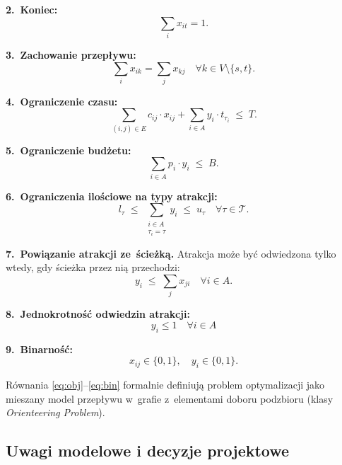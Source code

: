 \textbf{2.\ Koniec:}
\begin{equation}
\sum_{i} x_{i t} = 1 .
\label{eq:end}
\end{equation}

\textbf{3.\ Zachowanie przepływu:}
\begin{equation}
\sum_{i} x_{i k} = \sum_{j} x_{k j}
\quad \forall k \in V \setminus \{s, t\} .
\label{eq:flow}
\end{equation}

\textbf{4.\ Ograniczenie czasu:}
\begin{equation}
\sum_{(i,j) \in E} c_{ij} \cdot x_{ij}
+ \sum_{i \in A} y_i \cdot t_{\tau_i}
\;\le\; T .
\label{eq:time}
\end{equation}

\textbf{5.\ Ograniczenie budżetu:}
\begin{equation}
\sum_{i \in A} p_i \cdot y_i \;\le\; B .
\label{eq:budget}
\end{equation}

\textbf{6.\ Ograniczenia ilościowe na typy atrakcji:}
\begin{equation}
l_{\tau} \;\le\; \sum_{\substack{i \in A \\ \tau_i = \tau}} y_i \;\le\; u_{\tau}
\quad \forall \tau \in \mathcal{T} .
\label{eq:types}
\end{equation}

\textbf{7.\ Powiązanie atrakcji ze~ścieżką.}
Atrakcja może być odwiedzona tylko wtedy, gdy ścieżka przez nią przechodzi:
\begin{equation}
y_i \;\le\; \sum_{j} x_{j i} \quad \forall i \in A .
\label{eq:link}
\end{equation}

\textbf{8.\ Jednokrotność odwiedzin atrakcji:}
\begin{equation}
y_i \le 1 \quad \forall i \in A
\label{eq:attr-unique}
\end{equation}

\textbf{9.\ Binarność:}
\begin{equation}
x_{ij} \in \{0, 1\}, \quad y_i \in \{0, 1\} .
\label{eq:bin}
\end{equation}

Równania \eqref{eq:obj}--\eqref{eq:bin} formalnie definiują problem
optymalizacji jako mieszany model przepływu w~grafie z~elementami doboru
podzbioru (klasy \emph{Orienteering Problem}).

\subsection{Uwagi modelowe i decyzje projektowe}

